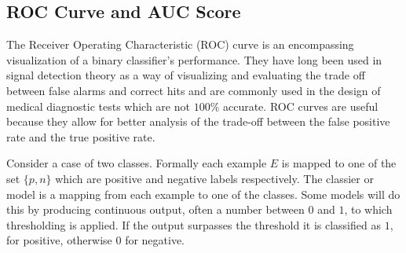 \subsection{ROC Curve and AUC Score}
The Receiver Operating Characteristic (ROC) curve is an encompassing visualization of a binary classifier's performance\citep{sokolova2006beyond}\citep{davis2006relationship}\citep{fawcett2006introduction}.
They have long been used in signal detection theory as a way of visualizing and evaluating the trade off between false alarms and correct hits and are commonly used in the design of medical diagnostic tests which are not $100\%$ accurate.
ROC curves are useful because they allow for better analysis of the trade-off between the false positive rate and the true positive rate.

Consider a case of two classes.
Formally each example $E$ is mapped to one of the set $\{p, n\}$ which are positive and negative labels respectively.
The classier or model is a mapping from each example to one of the classes.
Some models will do this by producing continuous output, often a number between $0$ and $1$, to which thresholding is applied.
If the output surpasses the threshold it is classified as $1$, for positive, otherwise $0$ for negative.


